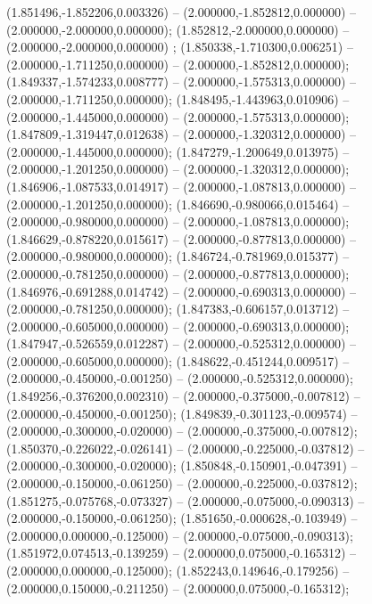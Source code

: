  (1.851496,-1.852206,0.003326) -- (2.000000,-1.852812,0.000000) -- (2.000000,-2.000000,0.000000);
 (1.852812,-2.000000,0.000000) -- (2.000000,-2.000000,0.000000) ;
 (1.850338,-1.710300,0.006251) -- (2.000000,-1.711250,0.000000) -- (2.000000,-1.852812,0.000000);
 (1.849337,-1.574233,0.008777) -- (2.000000,-1.575313,0.000000) -- (2.000000,-1.711250,0.000000);
 (1.848495,-1.443963,0.010906) -- (2.000000,-1.445000,0.000000) -- (2.000000,-1.575313,0.000000);
 (1.847809,-1.319447,0.012638) -- (2.000000,-1.320312,0.000000) -- (2.000000,-1.445000,0.000000);
 (1.847279,-1.200649,0.013975) -- (2.000000,-1.201250,0.000000) -- (2.000000,-1.320312,0.000000);
 (1.846906,-1.087533,0.014917) -- (2.000000,-1.087813,0.000000) -- (2.000000,-1.201250,0.000000);
 (1.846690,-0.980066,0.015464) -- (2.000000,-0.980000,0.000000) -- (2.000000,-1.087813,0.000000);
 (1.846629,-0.878220,0.015617) -- (2.000000,-0.877813,0.000000) -- (2.000000,-0.980000,0.000000);
 (1.846724,-0.781969,0.015377) -- (2.000000,-0.781250,0.000000) -- (2.000000,-0.877813,0.000000);
 (1.846976,-0.691288,0.014742) -- (2.000000,-0.690313,0.000000) -- (2.000000,-0.781250,0.000000);
 (1.847383,-0.606157,0.013712) -- (2.000000,-0.605000,0.000000) -- (2.000000,-0.690313,0.000000);
 (1.847947,-0.526559,0.012287) -- (2.000000,-0.525312,0.000000) -- (2.000000,-0.605000,0.000000);
 (1.848622,-0.451244,0.009517) -- (2.000000,-0.450000,-0.001250) -- (2.000000,-0.525312,0.000000);
 (1.849256,-0.376200,0.002310) -- (2.000000,-0.375000,-0.007812) -- (2.000000,-0.450000,-0.001250);
 (1.849839,-0.301123,-0.009574) -- (2.000000,-0.300000,-0.020000) -- (2.000000,-0.375000,-0.007812);
 (1.850370,-0.226022,-0.026141) -- (2.000000,-0.225000,-0.037812) -- (2.000000,-0.300000,-0.020000);
 (1.850848,-0.150901,-0.047391) -- (2.000000,-0.150000,-0.061250) -- (2.000000,-0.225000,-0.037812);
 (1.851275,-0.075768,-0.073327) -- (2.000000,-0.075000,-0.090313) -- (2.000000,-0.150000,-0.061250);
 (1.851650,-0.000628,-0.103949) -- (2.000000,0.000000,-0.125000) -- (2.000000,-0.075000,-0.090313);
 (1.851972,0.074513,-0.139259) -- (2.000000,0.075000,-0.165312) -- (2.000000,0.000000,-0.125000);
 (1.852243,0.149646,-0.179256) -- (2.000000,0.150000,-0.211250) -- (2.000000,0.075000,-0.165312);
